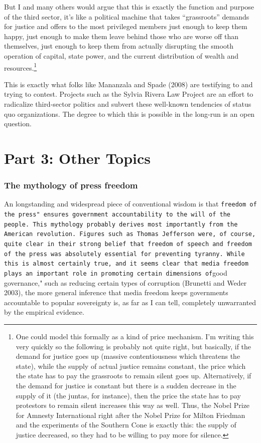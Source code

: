 \documentclass[12pt,book]{article}
\begin{document}
But I and many others would argue that this is exactly the function and
purpose of the third sector, it's like a political machine that takes
``grassroots'' demands for justice and offers to the most privileged
members just enough to keep them happy, just enough to make them leave
behind those who are worse off than themselves, just enough to keep them
from actually disrupting the smooth operation of capital, state power,
and the current distribution of wealth and resources.\footnote{One could
  model this formally as a kind of price mechanism. I'm writing this
  very quickly so the following is probably not quite right, but
  basically, if the demand for justice goes up (massive contentiousness
  which threatens the state), while the supply of actual justice remains
  constant, the price which the state has to pay the grassroots to
  remain silent goes up. Alternatively, if the demand for justice is
  constant but there is a sudden decrease in the supply of it (the
  juntas, for instance), then the price the state has to pay protestors
  to remain silent increases this way as well. Thus, the Nobel Prize for
  Amnesty International right after the Nobel Prize for Milton Friedman
  and the experiments of the Southern Cone is exactly this: the supply
  of justice decreased, so they had to be willing to pay more for
  silence.}

This is exactly what folks like Mananzala and Spade (2008) are
testifying to and trying to contest. Projects such as the Sylvia Rivera
Law Project are an effort to radicalize third-sector politics and
subvert these well-known tendencies of status quo organizations. The
degree to which this is possible in the long-run is an open question.

\section{Part 3: Other Topics}\label{part-3-other-topics}

\subsubsection{The mythology of press
freedom}\label{the-mythology-of-press-freedom}

An longstanding and widespread piece of conventional wisdom is that
\texttt{freedom of the press" ensures government accountability to the will of the people. This mythology probably derives most importantly from the American revolution. Figures such as Thomas Jefferson were, of course, quite clear in their strong belief that freedom of speech and freedom of the press was absolutely essential for preventing tyranny. While this is almost certainly true, and it seems clear that media freedom plays an important role in promoting certain dimensions of}good
governance," such as reducing certain types of corruption (Brunetti and
Weder 2003), the more general inference that media freedom keeps
governments accountable to popular sovereignty is, as far as I can tell,
completely unwarranted by the empirical evidence.
\end{document}
